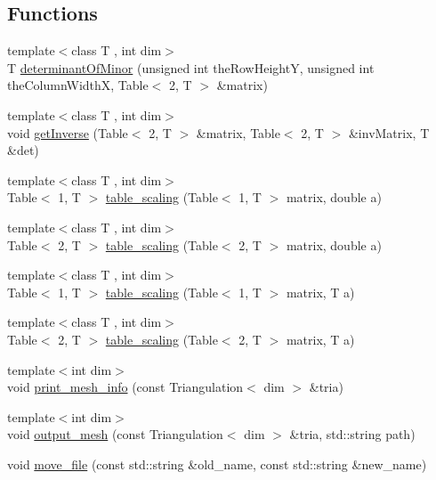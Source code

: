 \subsection*{Functions}
\begin{DoxyCompactItemize}
\item 
{\footnotesize template$<$class T , int dim$>$ }\\T \hyperlink{supplementary_functions_8h_a95bed1847eed9d7f9da90da4aa8fe7c1}{determinant\-Of\-Minor} (unsigned int the\-Row\-Height\-Y, unsigned int the\-Column\-Width\-X, Table$<$ 2, T $>$ \&matrix)
\item 
{\footnotesize template$<$class T , int dim$>$ }\\void \hyperlink{supplementary_functions_8h_ade5a79ed03042894cbe451fc7e1ccdf1}{get\-Inverse} (Table$<$ 2, T $>$ \&matrix, Table$<$ 2, T $>$ \&inv\-Matrix, T \&det)
\item 
{\footnotesize template$<$class T , int dim$>$ }\\Table$<$ 1, T $>$ \hyperlink{supplementary_functions_8h_ab98a2b7c384c7057fc9fca4a37350c63}{table\-\_\-scaling} (Table$<$ 1, T $>$ matrix, double a)
\item 
{\footnotesize template$<$class T , int dim$>$ }\\Table$<$ 2, T $>$ \hyperlink{supplementary_functions_8h_a6426196fb732830b7cae464a93ee2b15}{table\-\_\-scaling} (Table$<$ 2, T $>$ matrix, double a)
\item 
{\footnotesize template$<$class T , int dim$>$ }\\Table$<$ 1, T $>$ \hyperlink{supplementary_functions_8h_a5cd1e11e92aa6488e65b7ee7ef8acfb4}{table\-\_\-scaling} (Table$<$ 1, T $>$ matrix, T a)
\item 
{\footnotesize template$<$class T , int dim$>$ }\\Table$<$ 2, T $>$ \hyperlink{supplementary_functions_8h_a33371416e7cbc73fd7af9a9df5c7c2f7}{table\-\_\-scaling} (Table$<$ 2, T $>$ matrix, T a)
\item 
{\footnotesize template$<$int dim$>$ }\\void \hyperlink{group___supplementary_ga2971a293263dddc17f3df81add2ffbbe}{print\-\_\-mesh\-\_\-info} (const Triangulation$<$ dim $>$ \&tria)
\item 
{\footnotesize template$<$int dim$>$ }\\void \hyperlink{group___supplementary_ga0272b346b175b931e89b017fd93b5b80}{output\-\_\-mesh} (const Triangulation$<$ dim $>$ \&tria, std\-::string path)
\item 
void \hyperlink{group___supplementary_gae0eb2d2afc3e33a9bb3b409b0171c470}{move\-\_\-file} (const std\-::string \&old\-\_\-name, const std\-::string \&new\-\_\-name)
\end{DoxyCompactItemize}


